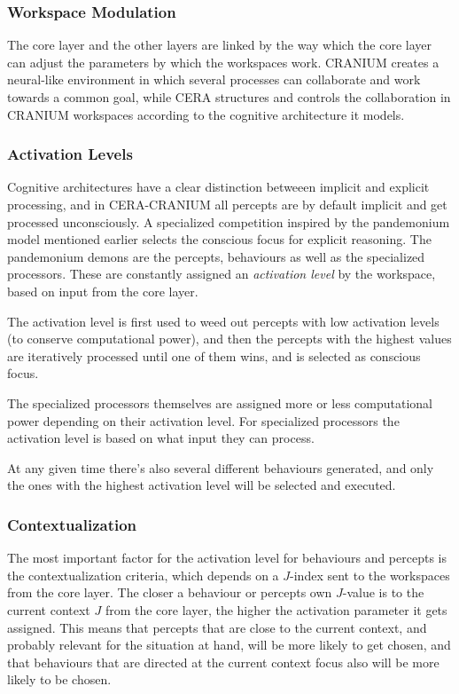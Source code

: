 \subsubsection{Workspace Modulation}
The core layer and the other layers are linked by the way which the
core layer can adjust the parameters by which the workspaces work. CRANIUM
creates a neural-like environment in which several processes can collaborate
and work towards a common goal, while CERA structures and controls the
collaboration in CRANIUM workspaces according to the cognitive architecture it
models.

\subsubsection{Activation Levels}
Cognitive architectures have a clear distinction betweeen implicit and explicit
processing\cite{atkinson2000consciousness}, and in CERA-CRANIUM all percepts
are by default implicit and get processed unconsciously. A specialized
competition inspired by the pandemonium model mentioned earlier selects the
conscious focus for explicit reasoning. The pandemonium demons are the
percepts, behaviours as well as the specialized processors. These are
constantly assigned an \textit{activation level} by the workspace, based on
input from the core layer.

The activation level is first used to weed out percepts with low activation
levels (to conserve computational power), and then the percepts with the highest
values are iteratively processed until one of them wins, and is selected as
conscious focus.

The specialized processors themselves are assigned more or less computational
power depending on their activation level. For specialized processors the
activation level is based on what input they can process.

At any given time there's also several different behaviours generated, and only
the ones with the highest activation level will be selected and executed.

\subsubsection{Contextualization}
The most important factor for the activation level for behaviours and percepts
is the contextualization criteria, which depends on a $J$-index sent to the
workspaces from the core layer. The closer a behaviour or percepts own $J$-value
is to the current context $J$ from the core layer, the higher the activation
parameter it gets assigned. This means that percepts that are close to the
current context, and probably relevant for the situation at hand, will be more
likely to get chosen, and that behaviours that are directed at the current
context focus also will be more likely to be chosen.

